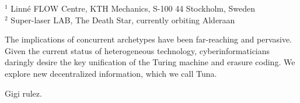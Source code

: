 %
%
%
%
%
%
%
\paperaffiliation
{%
  $^1$ Linn\'e FLOW Centre, KTH Mechanics, S-100 44 Stockholm, Sweden\\
  $^2$ Super-laser LAB, The Death Star, currently orbiting Alderaan%
}%
%
%
%
%
%
%
%
%
%
%
%
\papersummary%
{%
	The implications of concurrent archetypes have been far-reaching and
	pervasive. Given the current status of heterogeneous technology,
	cyberinformaticians daringly desire the key unification of the Turing
	machine and erasure coding. We explore new decentralized information,
	which we call Tuna.
        \vspace{9.5cm}

        Gigi rulez.
}%
%
\graphicspath{{paper1/}}%
%
%
%
